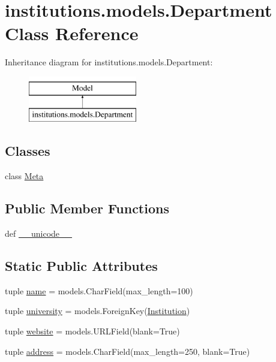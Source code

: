\hypertarget{classinstitutions_1_1models_1_1_department}{\section{institutions.\-models.\-Department Class Reference}
\label{classinstitutions_1_1models_1_1_department}
}
Inheritance diagram for institutions.\-models.\-Department\-:\begin{figure}[H]
\begin{center}
\leavevmode
\includegraphics[height=2.000000cm]{classinstitutions_1_1models_1_1_department}
\end{center}
\end{figure}
\subsection*{Classes}
\begin{DoxyCompactItemize}
\item 
class \hyperlink{classinstitutions_1_1models_1_1_department_1_1_meta}{Meta}
\end{DoxyCompactItemize}
\subsection*{Public Member Functions}
\begin{DoxyCompactItemize}
\item 
def \hyperlink{classinstitutions_1_1models_1_1_department_a182cf6a1d444ae12d7a46f9af48b1d76}{\-\_\-\-\_\-unicode\-\_\-\-\_\-}
\end{DoxyCompactItemize}
\subsection*{Static Public Attributes}
\begin{DoxyCompactItemize}
\item 
tuple \hyperlink{classinstitutions_1_1models_1_1_department_af0ed86723f8dd650bc247e0031040ab5}{name} = models.\-Char\-Field(max\-\_\-length=100)
\item 
tuple \hyperlink{classinstitutions_1_1models_1_1_department_a795e142ad93251bbbb48c2d6876da66b}{university} = models.\-Foreign\-Key(\hyperlink{classinstitutions_1_1models_1_1_institution}{Institution})
\item 
tuple \hyperlink{classinstitutions_1_1models_1_1_department_ae65b989d60e9675953738611a7155fd8}{website} = models.\-U\-R\-L\-Field(blank=True)
\item 
tuple \hyperlink{classinstitutions_1_1models_1_1_department_abfc146b0adecf2f352b698266a457a25}{address} = models.\-Char\-Field(max\-\_\-length=250, blank=True)
\end{DoxyCompactItemize}


